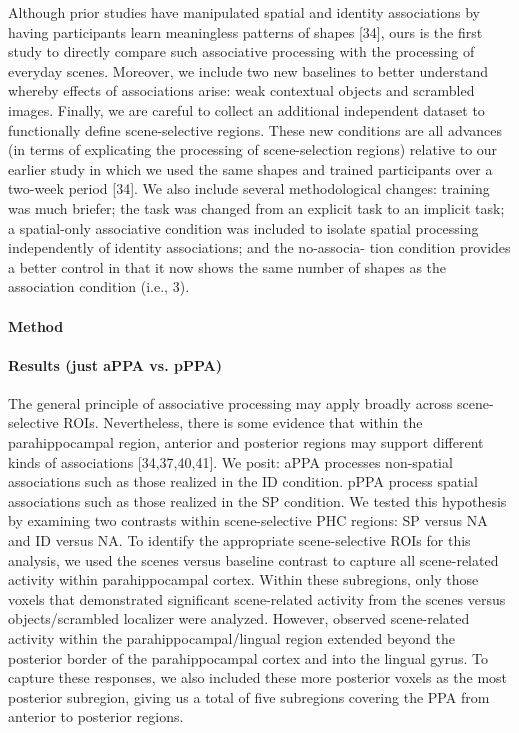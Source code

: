\documentclass[english]{article}
\begin{document}
%
Although prior studies have manipulated spatial and identity associations by
having participants learn meaningless patterns of shapes [34], ours is the first
study to directly compare such associative processing with the processing of
everyday scenes\citep{aminoff2015associative}.
%
Moreover, we include two new baselines to better understand whereby effects of
associations arise: weak contextual objects and scrambled images. Finally, we
are careful to collect an additional independent dataset to functionally define
scene-selective regions\citep{aminoff2015associative}.
%
These new conditions are all advances (in terms of explicating the processing of
scene-selection regions) relative to our earlier study in which we used the same
shapes and trained participants over a two-week period [34]\citep{aminoff2015associative}.
%
We also include several methodological changes: training was much briefer; the
task was changed from an explicit task to an implicit task; a spatial-only
associative condition was included to isolate spatial processing independently
of identity associations; and the no-associa- tion condition provides a better
control in that it now shows the same number of shapes as the association
condition (i.e., 3)\citep{aminoff2015associative}.

\paragraph{Method}

\paragraph{Results (just aPPA vs. pPPA)}

%
The general principle of associative processing may apply broadly across
scene-selective ROIs. Nevertheless, there is some evidence that within the
parahippocampal region, anterior and posterior regions may support different
kinds of associations [34,37,40,41]\citep{aminoff2015associative}.
%
We posit: aPPA processes non-spatial associations such as those realized in the
ID condition. pPPA process spatial associations such as those realized in the SP
condition\citep{aminoff2015associative}.
%
We tested this hypothesis by examining two contrasts within scene-selective PHC
regions: SP versus NA and ID versus NA\citep{aminoff2015associative}.
%
To identify the appropriate scene-selective ROIs for this analysis, we used the
scenes versus baseline contrast to capture all scene-related activity within
parahippocampal cortex\citep{aminoff2015associative}.
%
Within these subregions, only those voxels that demonstrated significant
scene-related activity from the scenes versus objects/scrambled localizer were
analyzed\citep{aminoff2015associative}.
%
However, observed scene-related activity within the parahippocampal/lingual
region extended beyond the posterior border of the parahippocampal cortex and
into the lingual gyrus\citep{aminoff2015associative}.
%
To capture these responses, we also included these more posterior voxels as the
most posterior subregion, giving us a total of five subregions covering the PPA
from anterior to posterior regions\citep{aminoff2015associative}.
\end{document}
